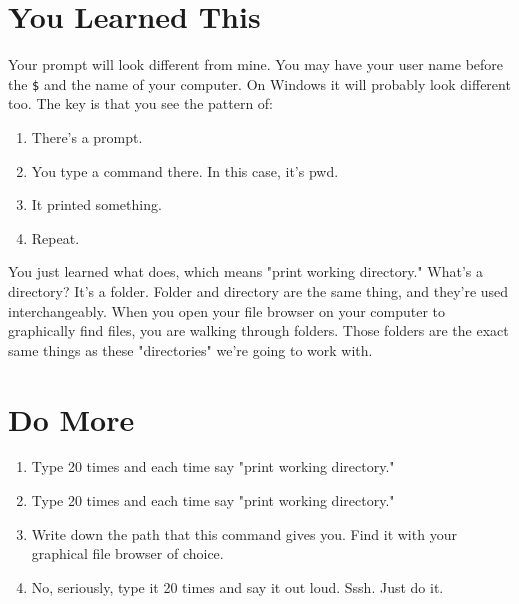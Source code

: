 \section{You Learned This}

Your prompt will look different from mine.  You may have your user
name before the \verb|$| and the name of your computer.  On Windows it will
probably look different too.  The key is that you see the pattern of:

\begin{enumerate}
\item There's a prompt.
\item You type a command there. In this case, it's pwd.
\item It printed something.
\item Repeat.
\end{enumerate}

You just learned what  does, which means "print working
directory."  What's a directory?  It's a folder.  Folder and directory are the
same thing, and they're used interchangeably.  When you open your file browser on your
computer to graphically find files, you are walking through folders.  Those
folders are the exact same things as these "directories" we're going to work
with.

\section{Do More}

\begin{enumerate}
\item Type  20 times and each time say "print working directory."
\item Type  20 times and each time say "print working directory."
\item Write down the path that this command gives you.  Find it with your 
    graphical file browser of choice.
\item No, seriously, type it 20 times and say it out loud.  Sssh.  Just do it.
\end{enumerate}


